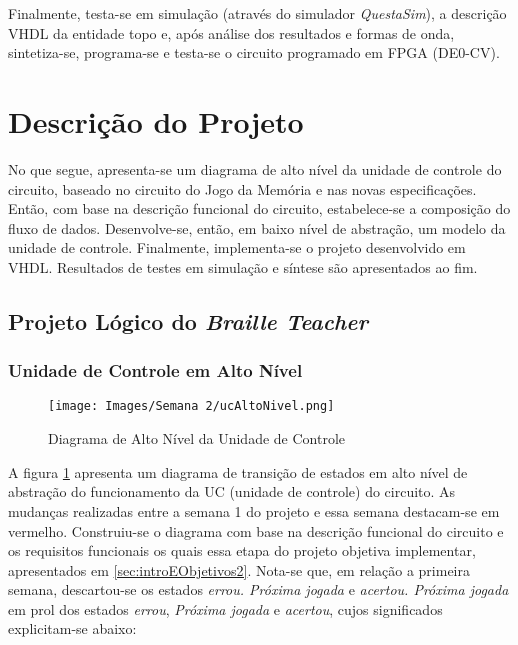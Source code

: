 \documentclass[amsmath,amssymb,floatfix]{report}
\begin{document}
Finalmente, testa-se em simulação (através do simulador \textit{QuestaSim}), a descrição VHDL da entidade topo e, após análise dos resultados e formas de onda, sintetiza-se, programa-se e testa-se o circuito programado em FPGA (DE0-CV).


\section{Descrição do Projeto}
\label{sec:descricaoDoProjeto2}

No que segue, apresenta-se um diagrama de alto nível da unidade de controle do circuito, baseado no circuito do Jogo da Memória e nas novas especificações. Então, com base na descrição funcional do circuito, estabelece-se a composição do fluxo de dados. Desenvolve-se, então, em baixo nível de abstração, um modelo da unidade de controle. Finalmente, implementa-se o projeto desenvolvido em VHDL. Resultados de testes em simulação e síntese são apresentados ao fim.

\subsection{Projeto Lógico do \textit{Braille Teacher}}
\label{subsec:projetoLogico2}

\subsubsection{Unidade de Controle em Alto Nível}
\label{subsubsec:ucAltoNivel2}

\begin{figure}[H]
    \centering
    \texttt{[image: Images/Semana 2/ucAltoNivel.png]}
    \caption{Diagrama de Alto Nível da Unidade de Controle}
    \label{fig:ucAltoNivel2}
\end{figure}

A figura \ref{fig:ucAltoNivel2} apresenta um diagrama de transição de estados em alto nível de abstração do funcionamento da UC (unidade de controle) do circuito. As mudanças realizadas entre a semana 1 do projeto e essa semana destacam-se em vermelho. Construiu-se o diagrama com base na descrição funcional do circuito e os requisitos funcionais os quais essa etapa do projeto objetiva implementar, apresentados em \ref{sec:introEObjetivos2}. Nota-se que, em relação a primeira semana, descartou-se os estados \textit{errou. Próxima jogada} e \textit{acertou. Próxima jogada} em prol dos estados \textit{errou}, \textit{Próxima jogada} e \textit{acertou}, cujos significados explicitam-se abaixo:
\end{document}
